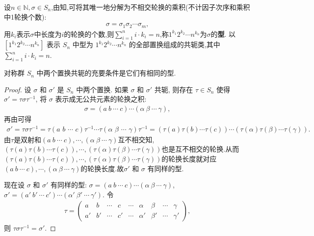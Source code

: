 \documentclass[../../main.tex]{subfiles}%
\begin{document}
\begin{definition}[置换的型]
设$n\in \mathbb{N},\sigma \in S_n$,由知,可将其唯一地分解为不相交轮换的乘积(不计因子次序和乘积中1轮换个数):
\begin{align*}
\sigma = \sigma_1\sigma_2\cdots \sigma_m,
\end{align*}
用$k_i$表示$\sigma$中长度为$i$的轮换的个数,则$\sum_{i=1}^{n}i\cdot k_i=n$,称$1^{k_1}2^{k_2}\cdots n^{k_n}$为$\sigma$的\textbf{型}.
以 $[1^{k_1} 2^{k_2} \cdots n^{k_n}]$ 表示 $S_n$ 中型为 $1^{k_1} 2^{k_2} \cdots n^{k_n}$ 的全部置换组成的共轭类,其中$\sum_{i=1}^{n}i\cdot k_i=n$. 
\end{definition}

\begin{theorem}[两个置换共轭的充要条件是它们有相同的型]\label{theorem:对称群中置换共轭等价于型相同}
对称群 $S_n$ 中两个置换共轭的充要条件是它们有相同的型.
\end{theorem}
\begin{proof}
设 $\sigma$ 和 $\sigma'$ 是 $S_n$ 中两个置换. 如果 $\sigma$ 和 $\sigma'$ 共轭, 则存在 $\tau \in S_n$ 使得 $\sigma' = \tau\sigma\tau^{-1}$, 将 $\sigma$ 表示成无公共元素的轮换之积:
\begin{align*}
\sigma = (a\ b\ \cdots\ c)\cdots(\alpha\ \beta\ \cdots\ \gamma),
\end{align*}
再由可得
\begin{align*}
\sigma' =\tau \sigma \tau ^{-1}=\tau (a\,\,b\,\,\cdots \,\,c)\tau ^{-1}\cdots \tau (\alpha \,\,\beta \,\,\cdots \,\,\gamma )\tau ^{-1}=(\tau (a) \tau (b)\cdots \tau (c))\cdots (\tau (\alpha ) \tau (\beta )\cdots \tau (\gamma )).
\end{align*}
由$\tau$是双射和$(a\ b\ \cdots\ c),\cdots,(\alpha\ \beta\ \cdots\ \gamma)$互不相交知,$(\tau (a) \tau (b)\cdots \tau (c)),\cdots, (\tau (\alpha ) \tau (\beta )\cdots \tau (\gamma ))$也是互不相交的轮换.从而$(\tau (a) \tau (b)\cdots \tau (c)),\cdots, (\tau (\alpha ) \tau (\beta )\cdots \tau (\gamma ))$的轮换长度就对应$(a\ b\ \cdots\ c),\cdots,(\alpha\ \beta\ \cdots\ \gamma)$的轮换长度.故$\sigma'$ 和 $\sigma$ 有同样的型. 

现在设 $\sigma$ 和 $\sigma'$ 有同样的型: $\sigma = (a\ b\ \cdots\ c)\cdots(\alpha\ \beta\ \cdots\ \gamma)$, $\sigma' = (a'\ b'\ \cdots\ c')\cdots(\alpha'\ \beta'\ \cdots\ \gamma')$. 令
\begin{align*}
\tau = \begin{pmatrix}
a & b & \cdots & c & \cdots & \alpha & \beta & \cdots & \gamma \\
a' & b' & \cdots & c' & \cdots & \alpha' & \beta' & \cdots & \gamma'
\end{pmatrix},
\end{align*}
则 $\tau\sigma\tau^{-1} = \sigma'$. 
\end{proof}
\end{document}
